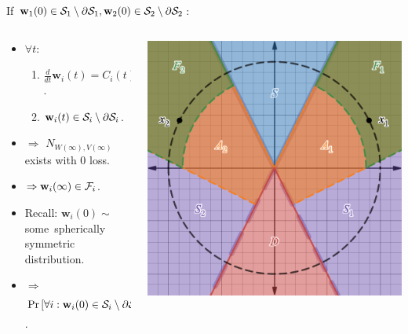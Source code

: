 \documentclass[handout,usenames,dvipsnames]{beamer} %
\newcommand{\bx}{\mathbf{x}}
\newcommand{\bw}{\mathbf{w}}
\newcommand{\cf}{{\cal F}}
\newcommand{\cs}{{\cal S}}
\begin{document}
\begin{frame}
    If $\bw_1(0) \in \cs_1 \setminus \partial \cs_1, \bw_2(0) \in \cs_2 \setminus \partial \cs_2$:
    \begin{columns}[T]
        \begin{column}{0.55\textwidth}
            \begin{itemize}[<+->]
                \item $\forall t:$
                \begin{enumerate}
                    \item $\frac{d}{dt} \bw_i(t) = C_i(t) \bx_i, C_i(t) \geq 0$.
                    \item $\bw_i(t) \in \cs_i \setminus \partial \cs_i$.
                \end{enumerate}
                \item $\Rightarrow$ $N_{W(\infty),V(\infty)}$ exists with $0$ loss.
                \item $\Rightarrow \bw_i(\infty) \in \cf_i$.
                \item Recall: $\bw_i(0) \sim$ some~spherically symmetric distribution.
                \item $\Rightarrow$ $\Pr \left[ \forall i : \bw_i(0) \in \cs_i \setminus \partial \cs_i \right] \ge 2 \cdot \left(\frac{\measuredangle(\bx_1,\bx_2)}{2\pi} \right)^2$.
                \hfill\qedsymbol
            \end{itemize}
        \end{column}

        \begin{column}{0.45\textwidth}
            \begin{center}
                \includegraphics[width=\textwidth]{figures/F_and_A_regions.png}%
            \end{center}
        \end{column}
    \end{columns}
    

\end{frame}
\end{document}
